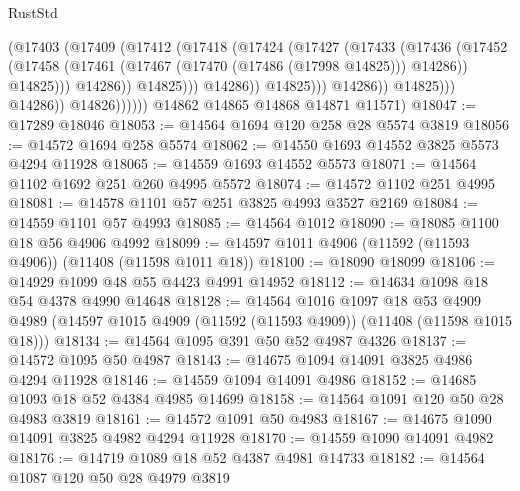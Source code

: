 \begin{lexlean}{RustStd}
\begin{coremodule}
                                      (@17403
                                        (@17409
                                          (@17412
                                            (@17418
                                              (@17424
                                                (@17427
                                                  (@17433
                                                    (@17436
                                                      (@17452
                                                        (@17458
                                                          (@17461
                                                            (@17467
                                                              (@17470 (@17486 (@17998 @14825)))
                                                              @14286))
                                                          @14825)))
                                                    @14286))
                                                @14825)))
                                          @14286))
                                      @14825)))
                                @14286))
                            @14825)))
                      @14286))
                  @14826))))))
      @14862
      @14865
      @14868
      @14871
      @11571)
@18047 := @17289 @18046
@18053 := @14564 @1694 @120 @258 @28 @5574 @3819
@18056 := @14572 @1694 @258 @5574
@18062 := @14550 @1693 @14552 @3825 @5573 @4294 @11928
@18065 := @14559 @1693 @14552 @5573
@18071 := @14564 @1102 @1692 @251 @260 @4995 @5572
@18074 := @14572 @1102 @251 @4995
@18081 := @14578 @1101 @57 @251 @3825 @4993 @3527 @2169
@18084 := @14559 @1101 @57 @4993
@18085 := @14564 @1012
@18090 := @18085 @1100 @18 @56 @4906 @4992
@18099 := @14597 @1011 @4906 (@11592 (@11593 @4906)) (@11408 (@11598 @1011 @18))
@18100 := @18090 @18099
@18106 := @14929 @1099 @48 @55 @4423 @4991 @14952
@18112 := @14634 @1098 @18 @54 @4378 @4990 @14648
@18128 := @14564
    @1016
    @1097
    @18
    @53
    @4909
    @4989
    (@14597 @1015 @4909 (@11592 (@11593 @4909)) (@11408 (@11598 @1015 @18)))
@18134 := @14564 @1095 @391 @50 @52 @4987 @4326
@18137 := @14572 @1095 @50 @4987
@18143 := @14675 @1094 @14091 @3825 @4986 @4294 @11928
@18146 := @14559 @1094 @14091 @4986
@18152 := @14685 @1093 @18 @52 @4384 @4985 @14699
@18158 := @14564 @1091 @120 @50 @28 @4983 @3819
@18161 := @14572 @1091 @50 @4983
@18167 := @14675 @1090 @14091 @3825 @4982 @4294 @11928
@18170 := @14559 @1090 @14091 @4982
@18176 := @14719 @1089 @18 @52 @4387 @4981 @14733
@18182 := @14564 @1087 @120 @50 @28 @4979 @3819

\end{coremodule}
\end{lexlean}
